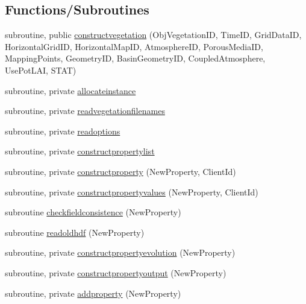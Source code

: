 \subsection*{Functions/\+Subroutines}
\begin{DoxyCompactItemize}
\item 
subroutine, public \mbox{\hyperlink{namespacemodulevegetation_ad61df3e43415a3c06f75588d06f77cce}{constructvegetation}} (Obj\+Vegetation\+ID, Time\+ID, Grid\+Data\+ID, Horizontal\+Grid\+ID, Horizontal\+Map\+ID, Atmosphere\+ID, Porous\+Media\+ID, Mapping\+Points, Geometry\+ID, Basin\+Geometry\+ID, Coupled\+Atmosphere, Use\+Pot\+L\+AI, S\+T\+AT)
\item 
subroutine, private \mbox{\hyperlink{namespacemodulevegetation_a1f6f35f8c49c08345fa70db3965f5763}{allocateinstance}}
\item 
subroutine, private \mbox{\hyperlink{namespacemodulevegetation_a8edd281bd5f3e5d91a3fea4575a31396}{readvegetationfilenames}}
\item 
subroutine, private \mbox{\hyperlink{namespacemodulevegetation_af3a330cccc5b43beef6be4d97ca341ad}{readoptions}}
\item 
subroutine, private \mbox{\hyperlink{namespacemodulevegetation_aa8b34aba441105ada4ef33de5fb88008}{constructpropertylist}}
\item 
subroutine, private \mbox{\hyperlink{namespacemodulevegetation_ac179d0f21b5052db939c21c142a5dda5}{constructproperty}} (New\+Property, Client\+Id)
\item 
subroutine, private \mbox{\hyperlink{namespacemodulevegetation_ad3fa17b279df119d651bb732e62a4f43}{constructpropertyvalues}} (New\+Property, Client\+Id)
\item 
subroutine \mbox{\hyperlink{namespacemodulevegetation_ac0764a40d57c0889573171b3f85afbf3}{checkfieldconsistence}} (New\+Property)
\item 
subroutine \mbox{\hyperlink{namespacemodulevegetation_a0a43607cdb2236530e5fb3fefa7498f1}{readoldhdf}} (New\+Property)
\item 
subroutine, private \mbox{\hyperlink{namespacemodulevegetation_ac6177be389c51bc5c4360fab4db5d775}{constructpropertyevolution}} (New\+Property)
\item 
subroutine, private \mbox{\hyperlink{namespacemodulevegetation_a107cf428abfe6d2909a01c200803e576}{constructpropertyoutput}} (New\+Property)
\item 
subroutine, private \mbox{\hyperlink{namespacemodulevegetation_a1831ceef19623bbd9a0c7d167abbb20e}{addproperty}} (New\+Property)

\end{DoxyCompactItemize}
